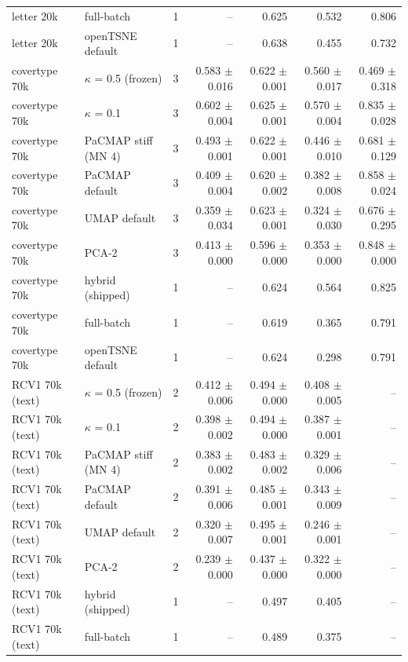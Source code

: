 \begin{tabular}{llrrrrr}
letter 20k & \magnet{} full-batch & 1 & -- & 0.625 & 0.532 & 0.806 \\
letter 20k & openTSNE default & 1 & -- & 0.638 & 0.455 & 0.732 \\
\midrule
covertype 70k & \magnet{} $\kappa$ = 0.5 (frozen) & 3 & 0.583 $\pm$ 0.016 & 0.622 $\pm$ 0.001 & 0.560 $\pm$ 0.017 & 0.469 $\pm$ 0.318 \\
covertype 70k & \magnet{} $\kappa$ = 0.1 & 3 & 0.602 $\pm$ 0.004 & 0.625 $\pm$ 0.001 & 0.570 $\pm$ 0.004 & 0.835 $\pm$ 0.028 \\
covertype 70k & PaCMAP stiff (MN 4) & 3 & 0.493 $\pm$ 0.001 & 0.622 $\pm$ 0.001 & 0.446 $\pm$ 0.010 & 0.681 $\pm$ 0.129 \\
covertype 70k & PaCMAP default & 3 & 0.409 $\pm$ 0.004 & 0.620 $\pm$ 0.002 & 0.382 $\pm$ 0.008 & 0.858 $\pm$ 0.024 \\
covertype 70k & UMAP default & 3 & 0.359 $\pm$ 0.034 & 0.623 $\pm$ 0.001 & 0.324 $\pm$ 0.030 & 0.676 $\pm$ 0.295 \\
covertype 70k & PCA-2 & 3 & 0.413 $\pm$ 0.000 & 0.596 $\pm$ 0.000 & 0.353 $\pm$ 0.000 & 0.848 $\pm$ 0.000 \\
covertype 70k & \magnet{} hybrid (shipped) & 1 & -- & 0.624 & 0.564 & 0.825 \\
covertype 70k & \magnet{} full-batch & 1 & -- & 0.619 & 0.365 & 0.791 \\
covertype 70k & openTSNE default & 1 & -- & 0.624 & 0.298 & 0.791 \\
\midrule
RCV1 70k (text) & \magnet{} $\kappa$ = 0.5 (frozen) & 2 & 0.412 $\pm$ 0.006 & 0.494 $\pm$ 0.000 & 0.408 $\pm$ 0.005 & -- \\
RCV1 70k (text) & \magnet{} $\kappa$ = 0.1 & 2 & 0.398 $\pm$ 0.002 & 0.494 $\pm$ 0.000 & 0.387 $\pm$ 0.001 & -- \\
RCV1 70k (text) & PaCMAP stiff (MN 4) & 2 & 0.383 $\pm$ 0.002 & 0.483 $\pm$ 0.002 & 0.329 $\pm$ 0.006 & -- \\
RCV1 70k (text) & PaCMAP default & 2 & 0.391 $\pm$ 0.006 & 0.485 $\pm$ 0.001 & 0.343 $\pm$ 0.009 & -- \\
RCV1 70k (text) & UMAP default & 2 & 0.320 $\pm$ 0.007 & 0.495 $\pm$ 0.001 & 0.246 $\pm$ 0.001 & -- \\
RCV1 70k (text) & PCA-2 & 2 & 0.239 $\pm$ 0.000 & 0.437 $\pm$ 0.000 & 0.322 $\pm$ 0.000 & -- \\
RCV1 70k (text) & \magnet{} hybrid (shipped) & 1 & -- & 0.497 & 0.405 & -- \\
RCV1 70k (text) & \magnet{} full-batch & 1 & -- & 0.489 & 0.375 & -- \\

\end{tabular}
